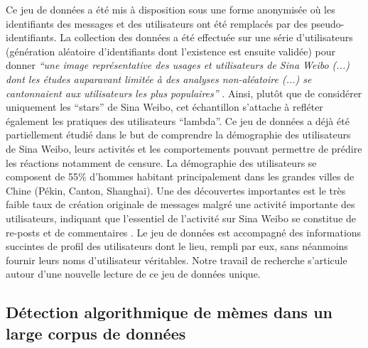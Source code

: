 Ce jeu de données a été mis à disposition sous une forme anonymisée o\`u les identifiants des messages et des utilisateurs ont été remplacés par des pseudo-identifiants. La collection des données a été effectuée sur une série d{\textquoteright}utilisateurs (génération aléatoire d{\textquoteright}identifiants dont l{\textquoteright}existence est ensuite validée) pour donner \textit{{\textquotedblleft}une image représentative des usages et utilisateurs de Sina Weibo (...) dont les études auparavant limitée à des analyses non-aléatoire (...) se cantonnaient aux utilisateurs les plus populaires{\textquotedblright} }\citep{Fu2013}. Ainsi, plut\^ot que de considérer uniquement les {\textquotedblleft}stars{\textquotedblright} de Sina Weibo, cet échantillon s{\textquoteright}attache à refléter également les pratiques des utilisateurs {\textquotedblleft}lambda{\textquotedblright}. Ce jeu de données a déjà été partiellement étudié dans le but de comprendre la démographie des utilisateurs de Sina Weibo, leurs activités et les comportements pouvant permettre de prédire les réactions notamment de censure. La démographie des utilisateurs se composent de 55\% d{\textquoteright}hommes habitant principalement dans les grandes villes de Chine (Pékin, Canton, Shanghai). Une des découvertes importantes est le très faible taux de création originale de messages malgré une activité importante des utilisateurs, indiquant que l{\textquoteright}essentiel de l{\textquoteright}activité sur Sina Weibo se constitue de re-posts et de commentaires \citep{Fu2013}. Le jeu de données est accompagné des informations succintes de profil des utilisateurs dont le lieu, rempli par eux, sans néanmoins fournir leurs noms d{\textquoteright}utilisateur véritables. Notre travail de recherche s{\textquoteright}articule autour d{\textquoteright}une nouvelle lecture de ce jeu de données unique.

\subsection[Détection algorithmique de mèmes]{Détection algorithmique de mèmes dans un large corpus de données}
\label{sec:protomemes}

